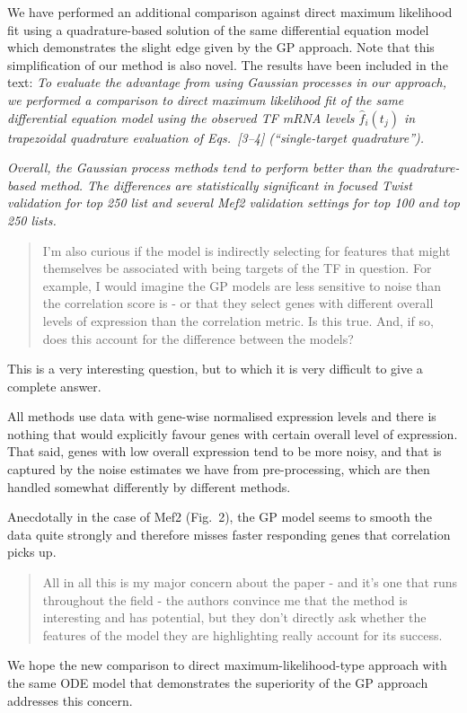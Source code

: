 \documentclass{article}
\begin{document}
We have performed an additional comparison against direct maximum
likelihood fit using a quadrature-based solution of the same
differential equation model which demonstrates the slight edge given
by the GP approach.  Note that this simplification of our method is
also novel.  The results have been included in the text:
\emph{To evaluate the advantage from using Gaussian processes in our
approach, we performed a comparison to direct maximum likelihood fit
of the same differential equation model using the observed TF mRNA
levels $\hat{f}_i(t_j)$ in trapezoidal quadrature evaluation of
Eqs.~[3--4]
(``single-target quadrature'').}

\emph{Overall, the Gaussian process methods tend to perform better than the
quadrature-based method. The differences are statistically significant
in focused Twist validation for top 250 list and several Mef2 validation
settings for top 100 and top 250 lists.}

\begin{quote} I'm also curious if the model is indirectly
    selecting for features that might themselves be associated with
    being targets of the TF in question. For example, I would imagine
    the GP models are less sensitive to noise than the correlation
    score is - or that they select genes with different overall levels
    of expression than the correlation metric. Is this true. And, if
    so, does this account for the difference between the models?
\end{quote}

This is a very interesting question, but to which it is very difficult
to give a complete answer.

All methods use data with gene-wise normalised expression levels and
there is nothing that would explicitly favour genes with certain
overall level of expression.  That said, genes with low overall
expression tend to be more noisy, and that is captured by the noise
estimates we have from pre-processing, which are then handled somewhat
differently by different methods.

Anecdotally in the case of Mef2 (Fig.~2), the GP model seems to smooth
the data quite strongly and therefore misses faster responding genes
that correlation picks up.


\begin{quote} All in all this is my major concern about the
    paper - and it's one that runs throughout the field - the authors
    convince me that the method is interesting and has potential, but
    they don't directly ask whether the features of the model they are
    highlighting really account for its success.
\end{quote}

We hope the new comparison to direct maximum-likelihood-type approach
with the same ODE model that demonstrates the superiority of the GP
approach addresses this concern.

\end{document}
